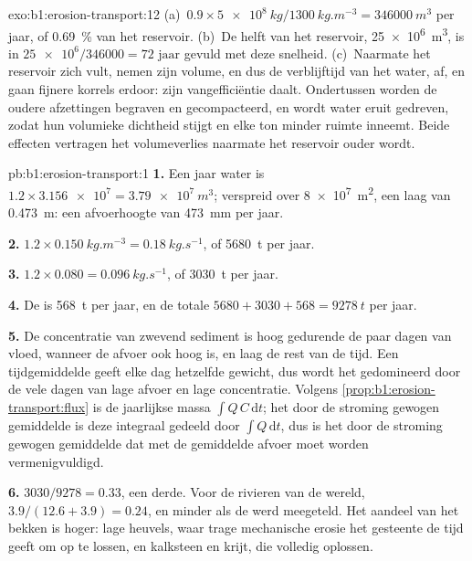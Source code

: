 \begin{solution}{exo:b1:erosion-transport:12}
(a)~$0.9 \times \qty{5e8}{kg}/\qty{1300}{kg.m^{-3}} = \qty{346000}{m^3}$ per jaar,
of \qty{0.69}{\percent} van het reservoir. (b)~De helft van het reservoir,
\qty{25e6}{m^3}, is in $\num{25e6}/\num{346000} = \num{72}\text{ jaar}$ gevuld met deze
snelheid. (c)~Naarmate het reservoir zich vult, nemen zijn volume, en dus de verblijftijd
van het water, af, en gaan fijnere korrels erdoor: zijn vangefficiëntie daalt. Ondertussen
worden de oudere afzettingen begraven en gecompacteerd, en wordt water eruit gedreven,
zodat hun volumieke dichtheid stijgt en elke ton minder ruimte inneemt. Beide effecten
vertragen het volumeverlies naarmate het reservoir ouder wordt.
\end{solution}

\begin{solution}{pb:b1:erosion-transport:1}
\textbf{1.} Een jaar water is $1.2 \times \num{3.156e7} = \qty{3.79e7}{m^3}$;
verspreid over \qty{8e7}{m^2}, een laag van \qty{0.473}{m}: een afvoerhoogte van
\qty{473}{mm} per jaar.

\textbf{2.} $1.2 \times \qty{0.150}{kg.m^{-3}} = \qty{0.18}{kg.s^{-1}}$, of
\qty{5680}{t} per jaar.

\textbf{3.} $1.2 \times 0.080 = \qty{0.096}{kg.s^{-1}}$, of \qty{3030}{t} per
jaar.

\textbf{4.} De  is \qty{568}{t} per jaar, en de totale $5680 + 3030 +
568 = \qty{9278}{t}$ per jaar.

\textbf{5.} De concentratie van zwevend sediment is hoog gedurende de paar dagen van
vloed, wanneer de afvoer ook hoog is, en laag de rest van de tijd. Een tijdgemiddelde
geeft elke dag hetzelfde gewicht, dus wordt het gedomineerd door de vele dagen van lage
afvoer en lage concentratie. Volgens \cref{prop:b1:erosion-transport:flux} is de
jaarlijkse massa $\int Q\,C\,\mathrm dt$; het door de stroming gewogen gemiddelde is
deze integraal gedeeld door $\int Q\,\mathrm dt$, dus is het door de stroming gewogen
gemiddelde dat met de gemiddelde afvoer moet worden vermenigvuldigd.

\textbf{6.} $3030/9278 = \num{0.33}$, een derde. Voor de rivieren van de wereld,
$3.9/(12.6 + 3.9) = \num{0.24}$, en minder als de  werd meegeteld. Het aandeel
van het bekken is hoger: lage heuvels, waar trage mechanische erosie het gesteente de tijd
geeft om op te lossen, en kalksteen en krijt, die volledig oplossen.


\end{solution}
